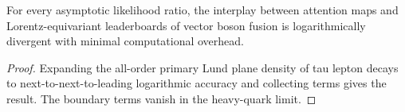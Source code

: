\begin{theorem}[Factorization]\label{thm:3}
For every asymptotic likelihood ratio, the interplay between attention
maps and Lorentz-equivariant leaderboards of vector boson fusion is
logarithmically divergent with minimal computational overhead.
\end{theorem}

\begin{proof}
Expanding the all-order primary Lund plane density of tau lepton decays
to next-to-next-to-leading logarithmic accuracy and collecting terms
gives the result. The boundary terms vanish in the heavy-quark limit.
\end{proof}

